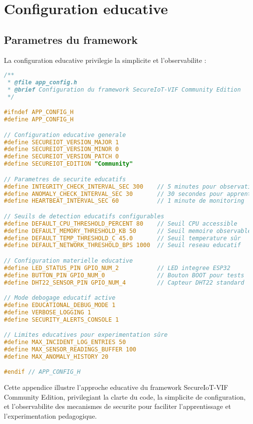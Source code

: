 \section{Configuration educative}

\subsection{Parametres du framework}

La configuration educative privilegie la simplicite et l'observabilite :

\begin{lstlisting}[language=C, caption={Configuration educative - app\_config.h}, label=lst:app-config]
/**
 * @file app_config.h
 * @brief Configuration du framework SecureIoT-VIF Community Edition
 */

#ifndef APP_CONFIG_H
#define APP_CONFIG_H

// Configuration educative generale
#define SECUREIOT_VERSION_MAJOR 1
#define SECUREIOT_VERSION_MINOR 0  
#define SECUREIOT_VERSION_PATCH 0
#define SECUREIOT_EDITION "Community"

// Parametres de securite educatifs
#define INTEGRITY_CHECK_INTERVAL_SEC 300    // 5 minutes pour observation
#define ANOMALY_CHECK_INTERVAL_SEC 30       // 30 secondes pour apprentissage
#define HEARTBEAT_INTERVAL_SEC 60           // 1 minute de monitoring

// Seuils de detection educatifs configurables
#define DEFAULT_CPU_THRESHOLD_PERCENT 80    // Seuil CPU accessible
#define DEFAULT_MEMORY_THRESHOLD_KB 50      // Seuil memoire observable  
#define DEFAULT_TEMP_THRESHOLD_C 45.0       // Seuil temperature sûr
#define DEFAULT_NETWORK_THRESHOLD_BPS 1000  // Seuil reseau educatif

// Configuration materielle educative
#define LED_STATUS_PIN GPIO_NUM_2           // LED integree ESP32
#define BUTTON_PIN GPIO_NUM_0               // Bouton BOOT pour tests
#define DHT22_SENSOR_PIN GPIO_NUM_4         // Capteur DHT22 standard

// Mode debogage educatif active
#define EDUCATIONAL_DEBUG_MODE 1
#define VERBOSE_LOGGING 1
#define SECURITY_ALERTS_CONSOLE 1

// Limites educatives pour experimentation sûre
#define MAX_INCIDENT_LOG_ENTRIES 50
#define MAX_SENSOR_READINGS_BUFFER 100
#define MAX_ANOMALY_HISTORY 20

#endif // APP_CONFIG_H
\end{lstlisting}

Cette appendice illustre l'approche educative du framework SecureIoT-VIF Community Edition, privilegiant la clarte du code, la simplicite de configuration, et l'observabilite des mecanismes de securite pour faciliter l'apprentissage et l'experimentation pedagogique.